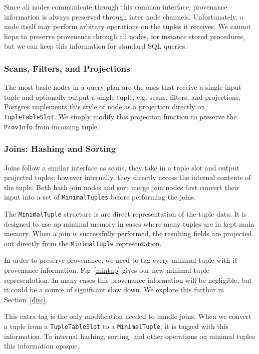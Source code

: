 Since all nodes communicate through this common interface, provenance information is always preserved through inter node channels. Unfortunately, a node itself may perform arbitary operations on the tuples it receives. We cannot hope to preserve provenence through all nodes, for instance stored procedures, but we can keep this information for standard SQL queries.  
 
\subsubsection{Scans, Filters, and Projections}

The most basic nodes in a query plan are the ones that receive a single input tuple and optionally output a single tuple, e.g. scans, filters, and projections. Postgres implements this style of node as a projection directly on \texttt{TupleTableSlot}. We simply modify this projection function to preserve the \texttt{ProvInfo} from incoming tuple.

\subsubsection{Joins: Hashing and Sorting}

Joins follow a similar interface as scans, they take in a tuple slot and output projected tuples; however internally, they directly access the internal contents of the tuple. Both hash join nodes and sort merge join nodes first convert their input into a set of \texttt{MinimalTuples} before performing the joins. 

The \texttt{MinimalTuple} structure is are direct representation of the tuple data. It is designed to use up minimal memory in cases where many tuples are in kept main memory. When a join is successfully performed, the resulting fields are projected out directly from the \texttt{MinimalTuple} representation. 

In order to preserve provenance, we need to tag every minimal tuple with it provenance information. Fig~\ref{mintup} gives our new minimal tuple representation. In many cases this provenance information will be negligible, but it could be a source of significant slow down. We explore this furthur in Section~\ref{disc}.

This extra tag is the only modification needed to handle joins. When we convert a tuple from a \texttt{TupleTableSlot} to a \texttt{MinimalTuple}, it is tagged with this information. To internal hashing, sorting, and other operations on minimal tuples this information opaque.   

